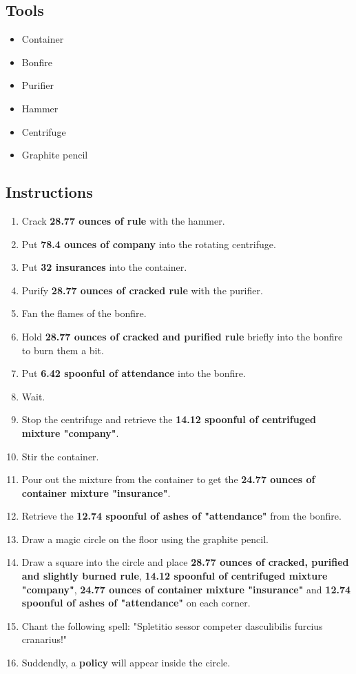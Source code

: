 \documentclass{article}
\begin{document}
\subsection{Tools}\begin{itemize}
\item 
Container
\item 
Bonfire
\item 
Purifier
\item 
Hammer
\item 
Centrifuge
\item 
Graphite pencil
\end{itemize}
\subsection{Instructions}\begin{enumerate}
\item 
Crack \textbf{28.77 ounces of rule} with the hammer.
\item 
Put \textbf{78.4 ounces of company} into the rotating centrifuge.
\item 
Put \textbf{32 insurances} into the container.
\item 
Purify \textbf{28.77 ounces of cracked rule} with the purifier.
\item 
Fan the flames of the bonfire.
\item 
Hold \textbf{28.77 ounces of cracked and purified rule} briefly into the bonfire to burn them a bit.
\item 
Put \textbf{6.42 spoonful of attendance} into the bonfire.
\item 
Wait.
\item 
Stop the centrifuge and retrieve the \textbf{14.12 spoonful of centrifuged mixture "company"}.
\item 
Stir the container.
\item 
Pour out the mixture from the container to get the \textbf{24.77 ounces of container mixture "insurance"}.
\item 
Retrieve the \textbf{12.74 spoonful of ashes of "attendance"} from the bonfire.
\item 
Draw a magic circle on the floor using the graphite pencil.
\item 
Draw a square into the circle and place \textbf{28.77 ounces of cracked, purified and slightly burned rule}, \textbf{14.12 spoonful of centrifuged mixture "company"}, \textbf{24.77 ounces of container mixture "insurance"} and \textbf{12.74 spoonful of ashes of "attendance"} on each corner.
\item 
Chant the following spell: "Spletitio sessor competer dasculibilis furcius cranarius!"
\item 
Suddendly, a \textbf{policy} will appear inside the circle.
\end{enumerate}
\newpage
\end{document}
